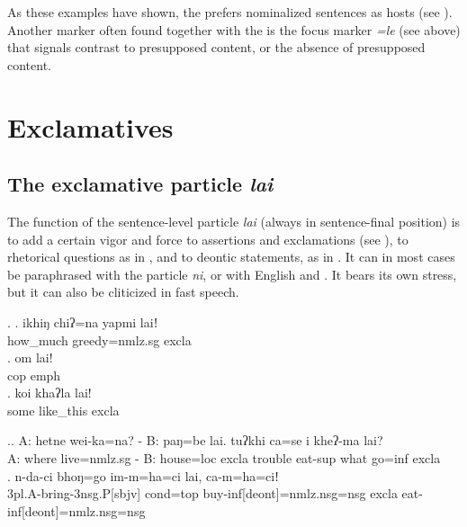  As these  examples have shown, the  prefers nominalized sentences as hosts (see ). Another marker often found together with the  is the focus marker \emph{=le} (see above) that signals contrast to presupposed content, or the absence of presupposed content.

 
\section{Exclamatives}\label{ptcl-excla}

\subsection{The exclamative particle \emph{lai}}
 
The  function of the sentence-level particle \emph{lai} (always in sentence-final position) is to add a certain vigor and force to assertions and exclamations (see \Next), to rhetorical questions as in \NNext[a], and to deontic statements, as in \NNext[b]. It can in most cases be paraphrased with the  particle \emph{ni}, or with English  and . It bears its own stress, but it can also be cliticized in fast speech. 
  
 \ex. \ag. ikhiŋ chiʔ=na yapmi laiǃ \\
 		how\_much greedy{\sc =nmlz.sg}  {\sc excla}\\
 	\bg. om lai!\\
 	{\sc cop} {\sc emph}\\
	    \bg. koi  khaʔla lai!\\
   		some like\_this {\sc excla}\\
	
 	\ex.\ag. A: hetne wei-ka=na?   - B: paŋ=be lai. tuʔkhi ca=se   i    kheʔ-ma lai?\\
 		A: where live{=nmlz.sg} - B: house{\sc =loc} {\sc excla} trouble eat{\sc -sup}  what go{\sc =inf} {\sc excla}\\
 	\bg. n-da-ci bhoŋ=go     im-m=ha=ci lai,  ca-m=ha=ciǃ\\
 			{\sc 3pl.A-}bring{\sc -3nsg.P[sbjv]} {\sc cond=top} buy{\sc -inf[deont]=nmlz.nsg=nsg} {\sc excla} eat{\sc -inf[deont]=nmlz.nsg=nsg}\\
 	 
	

